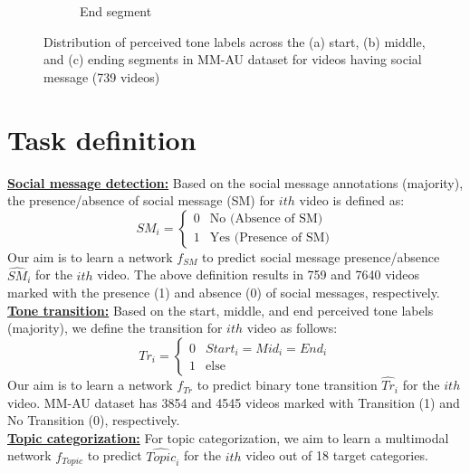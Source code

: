 \begin{figure}
\begin{subfigure}{.33\textwidth}
  \caption{End segment}
  \label{end_tone_social_message}
\end{subfigure}
\caption{Distribution of perceived tone labels across the (a) start, (b) middle, and (c) ending segments in MM-AU dataset for videos having social message (739 videos) }
\label{start_mid_end_soc_msg_tone}
\end{figure}
\section{Task definition}
\textbf{\underline{Social message detection:}}
Based on the social message annotations (majority), the presence/absence of social message (SM) for $ith$ video is defined as:
\begin{equation}
  SM_{i} =
    \begin{cases}
      0 & \text{No (Absence of SM)}\\
      1 & \text{Yes (Presence of SM)}
    \end{cases}       
\end{equation}
Our aim is to learn a network $f_{SM}$ to predict social message presence/absence $\hat{SM}_{i}$ for the $ith$ video. The above definition results in 759 and 7640 videos marked with the presence  (1) and absence (0) of social messages, respectively.\\
\textbf{\underline{Tone transition:}}
Based on the start, middle, and end perceived tone labels (majority), we define the transition for $ith$ video as follows:
\begin{equation}
  Tr_{i} =
    \begin{cases}
      0 & \text{$Start_{i}=Mid_{i}=End_{i}$}\\
      1 & \text{else}
    \end{cases}       
\end{equation}
Our aim is to learn a network $f_{Tr}$ to predict binary tone transition $\hat{Tr}_{i}$ for the $ith$ video.
MM-AU dataset has 3854 and 4545 videos marked with Transition (1) and No Transition (0), respectively.\\
\textbf{\underline{Topic categorization:}}
For topic categorization, we aim to learn a multimodal network $f_{Topic}$ to predict $\hat{Topic}_{i}$ for the $ith$ video out of 18 target categories. 
